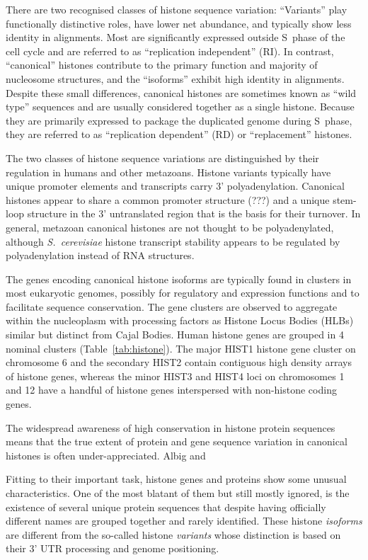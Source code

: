 \documentclass[10pt,a4paper,draft]{article}
\newcommand{\look}[2][]{\todo[caption={#2}, size=\small, #1]{\renewcommand{\baselinestretch}{0.5}\selectfont#2\par}}
\begin{document}
    There are two recognised classes of histone sequence variation: ``Variants'' play functionally distinctive
    roles, have lower net abundance, and typically show less identity in alignments. Most are significantly
    expressed outside S~phase of the cell cycle and are referred to as ``replication independent'' (RI).
    In contrast, ``canonical'' histones contribute to the primary function and majority of nucleosome
    structures, and the ``isoforms'' exhibit high identity in alignments. Despite these small differences,
    canonical histones are sometimes known as ``wild type'' sequences and are usually considered together
    as a single histone. Because they are primarily expressed to package the duplicated genome during S~phase,
    they are referred to as ``replication dependent'' (RD) or ``replacement'' histones.

    The two classes of histone sequence variations are distinguished by their regulation in humans and other
    metazoans. Histone variants typically have unique promoter elements and transcripts carry 3' polyadenylation.
    Canonical histones appear to share a common promoter structure (???) and a unique stem-loop structure in
    the 3' untranslated region that is the basis for their turnover. In general, metazoan canonical histones
    are not thought to be polyadenylated, although \textit{S.\ cerevisiae} histone transcript stability
    appears to be regulated by polyadenylation instead of RNA structures.

    The genes encoding canonical histone isoforms are typically found in clusters in most eukaryotic genomes,
    possibly for regulatory and expression functions and to facilitate sequence conservation. The gene clusters
    are observed to aggregate within the nucleoplasm with processing factors as Histone Locus Bodies
    (HLBs) similar but distinct from Cajal Bodies. Human histone genes are grouped in 4 nominal clusters
    (Table~\ref{tab:histone}). The major HIST1 histone gene cluster on chromosome 6 and the secondary
    HIST2 contain contiguous high density arrays of histone genes, whereas the minor HIST3 and HIST4
    loci on chromosomes 1 and 12 have a handful of histone genes interspersed with non-histone coding genes.

    The widespread awareness of high conservation in histone protein sequences means that the true extent
    of protein and gene sequence variation in canonical histones is often under-appreciated. Albig and 

    Fitting to their important task, histone genes and proteins show some unusual characteristics.
    One of the most blatant of them but still mostly ignored, is the existence of several unique protein
    sequences \look{should explain better that we're not talking about SNP?} that despite having
    officially different names are grouped together and rarely identified. These histone
    \emph{isoforms} are different from the so-called histone \emph{variants} whose distinction
    is based on their 3' UTR processing and genome positioning.
\end{document}
